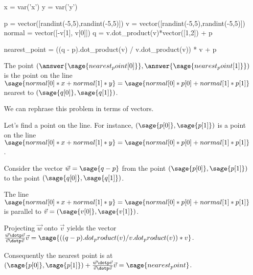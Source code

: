 \documentclass{ximera}
\author{Jim Fowler}
\begin{document}
\makerandom

\begin{sagesilent}
  x = var('x')
  y = var('y')
  
  p = vector([randint(-5,5),randint(-5,5)])
  v = vector([randint(-5,5),randint(-5,5)])
  normal = vector([-v[1], v[0]])
  q = v.dot_product(v)*vector([1,2]) + p

  nearest_point = ((q - p).dot_product(v) / v.dot_product(v)) * v + p
\end{sagesilent}

\begin{exercise}
  The point \(\left(\answer{\sage{nearest_point[0]}},\answer{\sage{nearest_point[1]}}\right)\) is the point on the line \(\sage{normal[0]*x + normal[1]*y} = \sage{normal[0]*p[0] + normal[1]*p[1]}\) nearest to \(\left(\sage{q[0]},\sage{q[1]}\right)\).

  \begin{hint}
    We can rephrase this problem in terms of vectors.
  \end{hint}
  
  \begin{hint}
    Let's find a point on the line.  For instance, \(\left(\sage{p[0]},\sage{p[1]}\right)\) is a point on the line \(\sage{normal[0]*x + normal[1]*y} = \sage{normal[0]*p[0] + normal[1]*p[1]}\).
  \end{hint}

  \begin{hint}
    Consider the vector $\vec{w} = \sage{q-p}$ from the point \(\left(\sage{p[0]},\sage{p[1]}\right)\) to the point \(\left(\sage{q[0]},\sage{q[1]}\right)\).
  \end{hint}

  \begin{hint}
    The line \(\sage{normal[0]*x + normal[1]*y} = \sage{normal[0]*p[0] + normal[1]*p[1]}\) is parallel to $\vec{v} = \left( \sage{v[0]}, \sage{v[1]} \right)$.
  \end{hint}

  \begin{hint}
    Projecting $\vec{w}$ onto $\vec{v}$ yields the vector \( \frac{\vec{w} \dotp \vec{v}}{\vec{v} \dotp \vec{v}} \vec{v} = \sage{((q - p).dot_product(v) / v.dot_product(v)) * v}\).
  \end{hint}

  \begin{hint}
    Consequently the nearest point is at \(\left(\sage{p[0]},\sage{p[1]}\right) + \frac{\vec{w} \dotp \vec{v}}{\vec{v} \dotp \vec{v}} \vec{v} = \sage{nearest_point}\).
  \end{hint}
  
\end{exercise}
\end{document}
